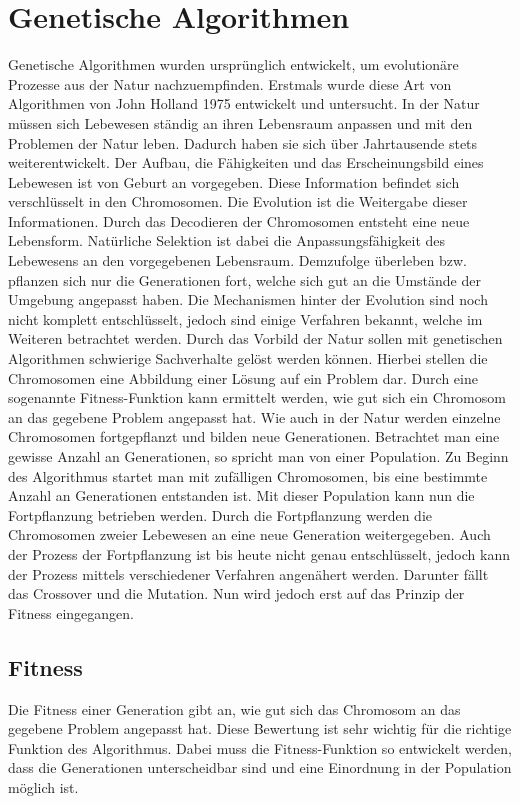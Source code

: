 \section{Genetische Algorithmen}
\label{sec:genetischer_algo}
Genetische Algorithmen wurden ursprünglich entwickelt, um evolutionäre Prozesse aus der Natur nachzuempfinden. Erstmals wurde diese Art von Algorithmen von John Holland 1975 entwickelt und untersucht.
In der Natur müssen sich Lebewesen ständig an ihren Lebensraum anpassen und mit den Problemen der Natur leben. Dadurch haben sie sich über Jahrtausende stets weiterentwickelt. Der Aufbau, die Fähigkeiten und das Erscheinungsbild eines Lebewesen ist von Geburt an vorgegeben. Diese Information befindet sich  verschlüsselt in den Chromosomen. Die Evolution ist die Weitergabe dieser Informationen. Durch das Decodieren der Chromosomen entsteht eine neue Lebensform.
Natürliche Selektion ist dabei die Anpassungsfähigkeit des Lebewesens an den vorgegebenen Lebensraum. Demzufolge überleben bzw. pflanzen sich nur die Generationen fort, welche sich gut an die Umstände der Umgebung angepasst haben. Die Mechanismen hinter der Evolution sind noch nicht komplett entschlüsselt, jedoch sind einige Verfahren bekannt, welche im Weiteren betrachtet werden.
Durch das Vorbild der Natur sollen mit genetischen Algorithmen schwierige Sachverhalte gelöst werden können. Hierbei stellen die Chromosomen eine Abbildung einer Lösung auf ein Problem dar. Durch eine sogenannte Fitness-Funktion kann ermittelt werden, wie gut sich ein Chromosom an das gegebene Problem angepasst hat. Wie auch in der Natur werden einzelne Chromosomen fortgepflanzt und bilden neue Generationen. Betrachtet man eine gewisse Anzahl an Generationen, so spricht man von einer Population. Zu Beginn des Algorithmus startet man mit zufälligen Chromosomen, bis eine bestimmte Anzahl an Generationen entstanden ist. Mit dieser Population kann nun die Fortpflanzung betrieben werden.
Durch die Fortpflanzung werden die Chromosomen zweier Lebewesen an eine neue Generation weitergegeben. Auch der Prozess der Fortpflanzung ist bis heute nicht genau entschlüsselt, jedoch kann der Prozess mittels verschiedener Verfahren angenähert werden. Darunter fällt das Crossover und die Mutation.\cite{davis1991handbook} Nun wird jedoch erst auf das Prinzip der Fitness eingegangen. 

\subsection{Fitness}
Die Fitness einer Generation gibt an, wie gut sich das Chromosom an das gegebene Problem angepasst hat. Diese Bewertung ist sehr wichtig für die richtige Funktion des Algorithmus. Dabei muss die Fitness-Funktion so entwickelt werden, dass die Generationen unterscheidbar sind und eine Einordnung in der Population möglich ist.\cite{davis1991handbook}

